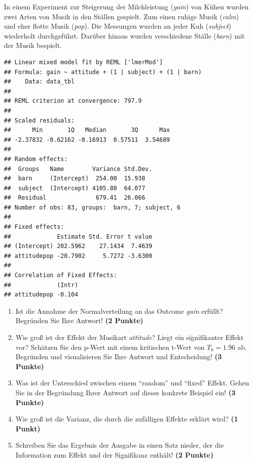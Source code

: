 \documentclass[a4paper, 10pt]{scrartcl}\usepackage[]{graphicx}\usepackage[]{xcolor}
\makeatletter
\newenvironment{kframe}{%
 \def\at@end@of@kframe{}%
 \ifinner\ifhmode%
  \def\at@end@of@kframe{\end{minipage}}%
  \begin{minipage}{\columnwidth}%
 \fi\fi%
 \def\FrameCommand##1{\hskip\@totalleftmargin \hskip-\fboxsep
 \colorbox{shadecolor}{##1}\hskip-\fboxsep
     \hskip-\linewidth \hskip-\@totalleftmargin \hskip\columnwidth}%
 \MakeFramed {\advance\hsize-\width
   \@totalleftmargin\z@ \linewidth\hsize
   \@setminipage}}%
 {\par\unskip\endMakeFramed%
 \at@end@of@kframe}
\newenvironment{knitrout}{}{} %
\makeatother
\begin{document}
In einem Experiment zur Steigerung der Milchleistung (\textit{gain}) von
K{\"u}hen wurden zwei Arten von Musik in den St{\"a}llen gespielt. Zum einen ruhige
Musik (\textit{calm}) und eher flotte Musik (\textit{pop}). Die Messungen
wurden an jeder Kuh (\textit{subject}) wiederholt durchgef{\"u}hrt. Dar{\"u}ber
hinaus wurden verschiedene St{\"a}lle (\textit{barn}) mit der Musik bespielt.

\begin{knitrout}
\color{fgcolor}\begin{kframe}
\begin{verbatim}
## Linear mixed model fit by REML ['lmerMod']
## Formula: gain ~ attitude + (1 | subject) + (1 | barn)
##    Data: data_tbl
## 
## REML criterion at convergence: 797.9
## 
## Scaled residuals: 
##      Min       1Q   Median       3Q      Max 
## -2.37832 -0.62162 -0.16913  0.57511  3.54689 
## 
## Random effects:
##  Groups   Name        Variance Std.Dev.
##  barn     (Intercept)  254.00  15.938  
##  subject  (Intercept) 4105.80  64.077  
##  Residual              679.41  26.066  
## Number of obs: 83, groups:  barn, 7; subject, 6
## 
## Fixed effects:
##             Estimate Std. Error t value
## (Intercept) 202.5962    27.1434  7.4639
## attitudepop -20.7902     5.7272 -3.6300
## 
## Correlation of Fixed Effects:
##             (Intr)
## attitudepop -0.104
\end{verbatim}
\end{kframe}
\end{knitrout}


\begin{enumerate}
\item Ist die Annahme der Normalverteilung an das Outcome \textit{gain} erf{\"u}llt?
  Begr{\"u}nden Sie Ihre Antwort! \textbf{(2 Punkte)}
\item Wie gro{\ss} ist der Effekt der Musikart \textit{attitude}? Liegt ein signifikanter
  Effekt vor? Sch{\"a}tzen Sie den p-Wert mit einem kritischen t-Wert von $T_k
  = 1.96$ ab. Begr{\"u}nden und visualisieren Sie Ihre Antwort und
  Entscheidung! \textbf{(3 Punkte)}
\item Was ist der Unterschied zwischen einem "`random"' und "`fixed"'
  Effekt. Gehen Sie in der Begr{\"u}ndung Ihrer Antwort auf dieses konkrete
  Beispiel ein! \textbf{(3 Punkte)}
\item Wie gro{\ss} ist die Varianz, die durch die zuf{\"a}lligen Effekte erkl{\"a}rt wird? \textbf{(1 Punkt)}
\item Schreiben Sie das Ergebnis der \Rlogo Ausgabe in einen Satz nieder, der die
  Information zum Effekt und der Signifikanz enth{\"a}lt! \textbf{(2 Punkte)}
\end{enumerate}
 
\end{document}

